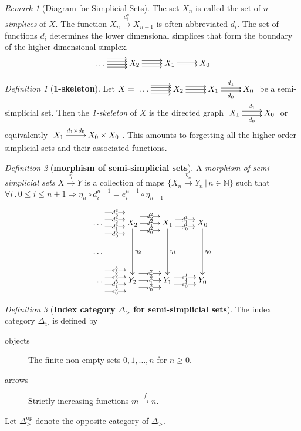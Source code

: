 \documentclass[10pt]{article}
\newcommand{\onearrow}[3]{\mbox{$#1 \stackrel{#2}{\longrightarrow} #3$}}
\theoremstyle{remark}
\newtheorem{remark}{Remark}
\newtheorem{definition}{Definition}
\begin{document}
\begin{remark}[Diagram for Simplicial Sets]
The set $X_n$ is called the set of $n$-\emph{simplices} of $X$. The function \onearrow{X_n}{d_i^n}{X_{n-1}} is often abbreviated $d_i$. The set of functions $d_i$ determines the lower dimensional simplices that form the boundary of the higher dimensional simplex.
$$ \xymatrix{
\ldots \ar@<1.25ex>[r]  \ar@<0.5ex>[r]  \ar@<-0.25ex>[r]  \ar@<-1.0ex>[r] &
     X_2 \ar@<0.75ex>[r]  \ar[r] \ar@<-0.75ex>[r] &
     X_1 \ar@<0.4ex>[r] \ar@<-0.4ex>[r] &
     X_0
} $$
\end{remark}

\begin{definition}[\textbf{1-skeleton}]
Let $X = 
\xymatrix{
\ldots \ar@<1.25ex>[r]  \ar@<0.5ex>[r]  \ar@<-0.25ex>[r]  \ar@<-1.0ex>[r] &
     X_2 \ar@<0.75ex>[r]  \ar[r] \ar@<-0.75ex>[r] &
     X_1 \ar@<0.4ex>[r]^{d_1} \ar@<-0.4ex>[r]_{d_0} &
     X_0
}
$ be a semi-simplicial set. Then the \emph{1-skeleton} of $X$ is the directed graph
$\xymatrix{
     X_1 \ar@<0.6ex>[r]^-{d_1} \ar@<-0.6ex>[r]_-{d_0} & X_0
}$
or equivalently
$\xymatrix{
     X_1 \ar[r]^-{d_1 \times d_0} & X_0 \times X_0
}$. This amounts to forgetting all the higher order simplicial sets and their associated functions.
\end{definition}

\begin{definition}[\textbf{morphism of semi-simplicial sets}]
A \emph{morphism of semi-simplicial sets} \onearrow{X}{\eta}{Y} is a collection of maps $\{ \onearrow{X_n}{\eta_n}{Y_n} \, | \,n \in \mathbb{N} \}$ such that $\forall i \, . \, 0 \leq i \leq n+1 \Longrightarrow \eta_n \circ d_i^{n+1} = e_i^{n+1} \circ \eta_{n+1}$
\end{definition}

$$
\xymatrix{
\ldots \ar@<3ex>[r]|{d_3^3}  \ar@<1 ex>[r]|{d_2^3}  \ar@<-1ex>[r]|{d_1^3}  \ar@<-3 ex>[r]|{d_0^3} &
     X_2 \ar@<2ex>[r]|{d_2^2}  \ar[r]|{d_1^2} \ar@<-2 ex>[r]|{d_0^2} \ar[dd]^{\eta_2} &
     X_1 \ar@<1ex>[r]|{d_1^1} \ar@<-1ex>[r]|{d_0^1} \ar[dd]^{\eta_1} &
     X_0 \ar[dd]^{\eta_0} \\
\ldots     \\
  \ldots \ar@<3ex>[r]|{e_3^3}  \ar@<1 ex>[r]|{e_2^3}  \ar@<-1ex>[r]|{d_1^3}  \ar@<-3 ex>[r]|{e_0^3} &
     Y_2 \ar@<2ex>[r]|{e_2^2}  \ar[r]|{e_1^2} \ar@<-2 ex>[r]|{e_0^2} &
     Y_1 \ar@<1ex>[r]|{e_1^1} \ar@<-1ex>[r]|{e_0^1} &
     Y_0
}
$$

\begin{definition}[\textbf{Index category $\Delta_{>}$ for semi-simplicial sets}]
The index category $\Delta_{>}$ is defined by
\begin{description}
\item [objects] The finite non-empty sets ${0,1, \ldots , n}$ for $n \geq 0$.
\item [arrows] Strictly increasing functions \onearrow{m}{f}{n}.
\end{description}
Let $\Delta_{>}^{\text{op}}$ denote the opposite category of $\Delta_{>}$.
\end{definition}
\end{document}
